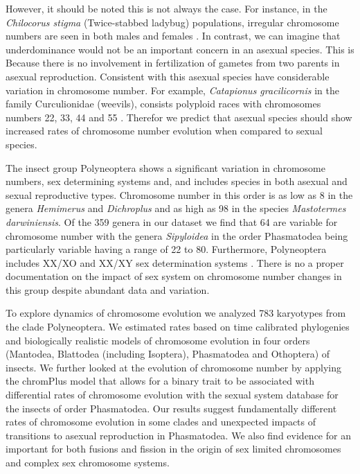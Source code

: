 However, it should be noted this is not always the case. For instance, in the \textit{Chilocorus stigma} (Twice-stabbed ladybug) populations, irregular chromosome numbers are seen in both males and females \citep{smith1962}.  
In contrast, we can imagine that underdominance would not be an important concern in an asexual species. 
This is Because there is no involvement in fertilization of gametes from two parents in asexual reproduction.
Consistent with this asexual species have considerable variation in chromosome number. 
For example, \textit{Catapionus gracilicornis} in the family Curculionidae (weevils), consists polyploid races with chromosomes numbers 22, 33, 44 and 55 \citep{lachowska1998}. 
Therefor we predict that asexual species should show increased rates of chromosome number evolution when compared to sexual species.

The insect group Polyneoptera shows a significant variation in chromosome numbers, sex determining systems and, and includes species in both asexual and sexual reproductive types. 
Chromosome number in this order is as low as 8 in the genera \textit{Hemimerus} and \textit{Dichroplus} and as high as 98 in the species \textit{Mastotermes darwiniensis}.
Of the 359 genera in our dataset we find that 64 are variable for chromosome number with the genera \textit{Sipyloidea} in the order Phasmatodea being particularly variable having a range of 22 to 80. 
Furthermore, Polyneoptera includes XX/XO and XX/XY sex determination systems \citep{blackmon2016}. 
There is no a proper documentation on the impact of sex system on chromosome number changes in this group despite abundant data and variation. 

To explore dynamics of chromosome evolution we analyzed 783 karyotypes from the clade Polyneoptera.
We estimated rates based on time calibrated phylogenies and biologically realistic models of chromosome evolution in four orders (Mantodea, Blattodea (including Isoptera), Phasmatodea and Othoptera) of insects.
We further looked at the evolution of chromosome number by applying the chromPlus model that allows for a binary trait to be associated with differential rates of chromosome evolution with the sexual system database for the insects of order Phasmatodea.
Our results suggest fundamentally different rates of chromosome evolution in some clades and unexpected impacts of transitions to asexual reproduction in Phasmatodea. 
We also find evidence for an important for both fusions and fission in the origin of sex limited chromosomes and complex sex chromosome systems.